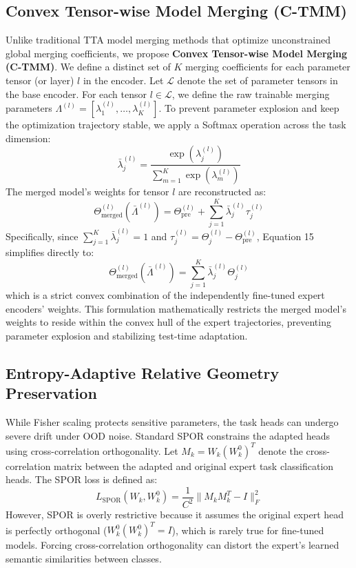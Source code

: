 \documentclass{article}
\begin{document}
\subsection{Convex Tensor-wise Model Merging (C-TMM)}
Unlike traditional TTA model merging methods that optimize unconstrained global merging coefficients, we propose \textbf{Convex Tensor-wise Model Merging (C-TMM)}. We define a distinct set of $K$ merging coefficients for each parameter tensor (or layer) $l$ in the encoder. Let $\mathcal{L}$ denote the set of parameter tensors in the base encoder. For each tensor $l \in \mathcal{L}$, we define the raw trainable merging parameters $\Lambda^{(l)} = [\lambda^{(l)}_1, \dots, \lambda^{(l)}_K]$. To prevent parameter explosion and keep the optimization trajectory stable, we apply a Softmax operation across the task dimension:
\begin{equation}
    \bar{\lambda}^{(l)}_j = \frac{\exp(\lambda^{(l)}_j)}{\sum_{m=1}^K \exp(\lambda^{(l)}_m)}
\end{equation}
The merged model's weights for tensor $l$ are reconstructed as:
\begin{equation}
    \Theta^{(l)}_{\text{merged}}(\bar{\Lambda}^{(l)}) = \Theta^{(l)}_{\text{pre}} + \sum_{j=1}^K \bar{\lambda}^{(l)}_j \tau^{(l)}_j
\end{equation}
Specifically, since $\sum_{j=1}^K \bar{\lambda}^{(l)}_j = 1$ and $\tau^{(l)}_j = \Theta^{(l)}_j - \Theta^{(l)}_{\text{pre}}$, Equation 15 simplifies directly to:
\begin{equation}
    \Theta^{(l)}_{\text{merged}}(\bar{\Lambda}^{(l)}) = \sum_{j=1}^K \bar{\lambda}^{(l)}_j \Theta^{(l)}_j
\end{equation}
which is a strict convex combination of the independently fine-tuned expert encoders' weights. This formulation mathematically restricts the merged model's weights to reside within the convex hull of the expert trajectories, preventing parameter explosion and stabilizing test-time adaptation.

\subsection{Entropy-Adaptive Relative Geometry Preservation}
While Fisher scaling protects sensitive parameters, the task heads can undergo severe drift under OOD noise. Standard SPOR \cite{spor26flatness} constrains the adapted heads using cross-correlation orthogonality. Let $M_k = W_k (W^0_k)^T$ denote the cross-correlation matrix between the adapted and original expert task classification heads. The SPOR loss is defined as:
\begin{equation}
    L_{\text{SPOR}}(W_k, W^0_k) = \frac{1}{C^2} \| M_k M_k^T - I \|_F^2
\end{equation}
However, SPOR is overly restrictive because it assumes the original expert head is perfectly orthogonal ($W^0_k (W^0_k)^T = I$), which is rarely true for fine-tuned models. Forcing cross-correlation orthogonality can distort the expert's learned semantic similarities between classes.
\end{document}
